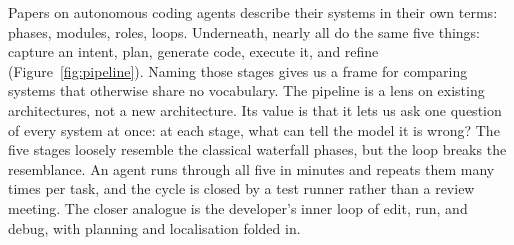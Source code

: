 \documentclass[
  english,        %
  font=times,     %
  twocolumn,      %
]{tumarticle}
\begin{document}
Papers on autonomous coding agents describe their systems in their own terms:
phases, modules, roles, loops. Underneath, nearly all do the same five things:
capture an intent, plan, generate code, execute it, and refine
(Figure~\ref{fig:pipeline}). Naming those stages gives us a frame for comparing
systems that otherwise share no vocabulary. The pipeline is a lens on existing
architectures, not a new architecture. Its value is that it lets us ask one
question of every system at once: at each stage, what can tell the model it is
wrong? The five stages loosely resemble the classical waterfall phases, but the
loop breaks the resemblance. An agent runs through all five in minutes and
repeats them many times per task, and the cycle is closed by a test runner
rather than a review meeting. The closer analogue is the
developer's inner loop of edit, run, and debug, with planning and localisation
folded in.
\end{document}
